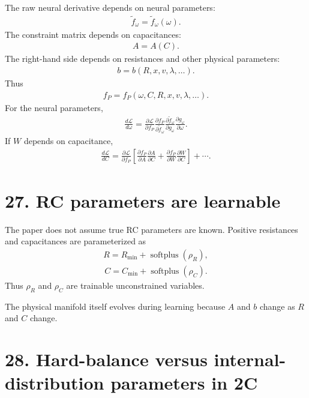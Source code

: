 \documentclass[11pt]{article}
\begin{document}
The raw neural derivative depends on neural parameters:
\begin{align}
\boxed{\widetilde f_\omega=\widetilde f_\omega(\omega).}
\tag{E5.95}
\end{align}
The constraint matrix depends on capacitances:
\begin{align}
\boxed{A=A(C).}
\tag{E5.96}
\end{align}
The right-hand side depends on resistances and other physical parameters:
\begin{align}
\boxed{b=b(R,x,v,\lambda,\ldots).}
\tag{E5.97}
\end{align}
Thus
\begin{align}
\boxed{f_P=f_P(\omega,C,R,x,v,\lambda,\ldots).}
\tag{E5.98}
\end{align}
For the neural parameters,
\begin{align}
\boxed{\frac{d\mathcal L}{d\omega}=\frac{\partial\mathcal L}{\partial f_P}\frac{\partial f_P}{\partial\widetilde f_\omega}\frac{\partial\widetilde f_\omega}{\partial g_\omega}\frac{\partial g_\omega}{\partial\omega}.}
\tag{E5.99}
\end{align}
If \(W\) depends on capacitance,
\begin{align}
\boxed{\frac{d\mathcal L}{dC}=\frac{\partial\mathcal L}{\partial f_P}\left[\frac{\partial f_P}{\partial A}\frac{\partial A}{\partial C}+\frac{\partial f_P}{\partial W}\frac{\partial W}{\partial C}\right]+\cdots.}
\tag{E5.100}
\end{align}

\section*{27. RC parameters are learnable}

The paper does not assume true RC parameters are known. Positive resistances and capacitances are parameterized as
\begin{align}
\boxed{R=R_{\min}+\operatorname{softplus}(\rho_R),}
\tag{E5.101}
\end{align}
\begin{align}
\boxed{C=C_{\min}+\operatorname{softplus}(\rho_C).}
\tag{E5.102}
\end{align}
Thus \(\rho_R\) and \(\rho_C\) are trainable unconstrained variables.

The physical manifold itself evolves during learning because \(A\) and \(b\) change as \(R\) and \(C\) change.

\section*{28. Hard-balance versus internal-distribution parameters in 2C}
\end{document}
